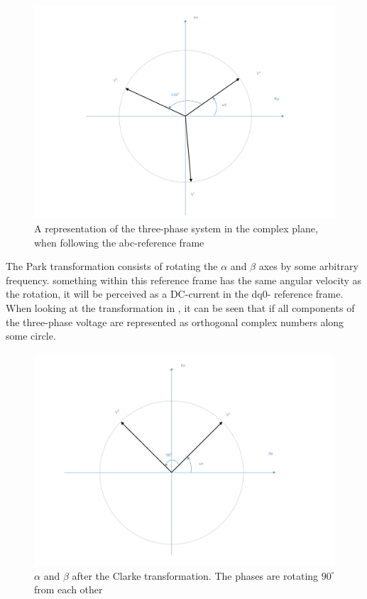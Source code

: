 \begin{figure}
    \centering
    \includegraphics[width=\textwidth,height=\textheight,keepaspectratio]{Figures/Untransformed_phase.pdf}
    \caption{A representation of the three-phase system in the complex plane, when following the abc-reference frame}
    \label{fig:Current_circle}
\end{figure}


The Park transformation consists of rotating the $\alpha$ and $\beta$ axes by some arbitrary frequency. something within this reference frame has the same angular velocity as the rotation, it will be perceived  as a DC-current in the dq0- reference frame.  When looking at the transformation in  , it can be seen that if all components of the three-phase voltage are represented as orthogonal complex numbers along some circle.




\begin{figure}
    \centering
    \includegraphics[width=\textwidth,height=\textheight,keepaspectratio]{Figures/Clarke_transformed.pdf}
    \caption{$\alpha$ and $\beta$ after the Clarke transformation. The phases are rotating $90^{\circ}$ from each other}
    \label{fig:First_clarke_transformation}
\end{figure}


